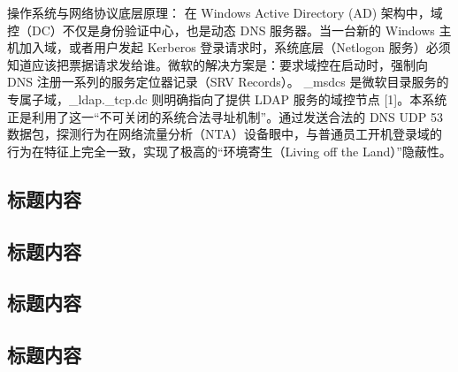 \documentclass[twoside,openright]{xduugthesis}
\begin{document}
操作系统与网络协议底层原理： 在 Windows Active Directory (AD) 架构中，域控（DC）不仅是身份验证中心，也是动态 DNS 服务器。当一台新的 Windows 主机加入域，或者用户发起 Kerberos 登录请求时，系统底层（Netlogon 服务）必须知道应该把票据请求发给谁。微软的解决方案是：要求域控在启动时，强制向 DNS 注册一系列的服务定位器记录（SRV Records）。 _msdcs 是微软目录服务的专属子域，_ldap._tcp.dc 则明确指向了提供 LDAP 服务的域控节点 [1]。本系统正是利用了这一“不可关闭的系统合法寻址机制”。通过发送合法的 DNS UDP 53 数据包，探测行为在网络流量分析（NTA）设备眼中，与普通员工开机登录域的行为在特征上完全一致，实现了极高的“环境寄生（Living off the Land）”隐蔽性。

\subsection{标题内容}

\subsection{标题内容}

\subsection{标题内容}

\subsection{标题内容}
\end{document}
